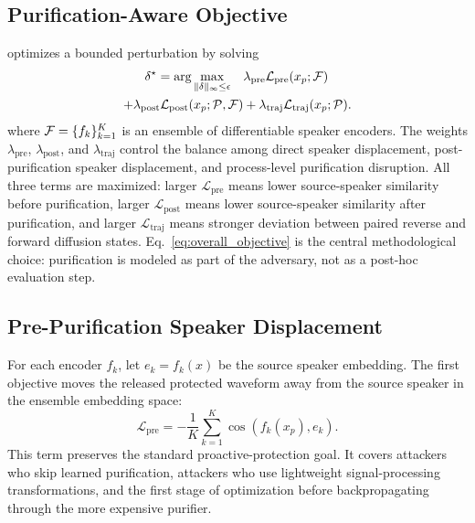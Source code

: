 \subsection{Purification-Aware Objective}

\method{} optimizes a bounded perturbation by solving
\begin{equation}
\begin{aligned}
    \delta^{\star}
    = \arg\max_{\|\delta\|_{\infty}\leq\epsilon}\quad
    &\lambda_{\text{pre}}\mathcal{L}_{\text{pre}}(x_p;\mathcal{F})\\
    + \lambda_{\text{post}}\mathcal{L}_{\text{post}}(x_p;\mathcal{P},\mathcal{F})
    &+ \lambda_{\text{traj}}\mathcal{L}_{\text{traj}}(x_p;\mathcal{P}).
\end{aligned}
\label{eq:overall_objective}
\end{equation}
where $\mathcal{F}=\{f_k\}_{k=1}^{K}$ is an ensemble of differentiable speaker encoders. 
The weights $\lambda_{\text{pre}}$, $\lambda_{\text{post}}$, and $\lambda_{\text{traj}}$ control the balance among direct speaker displacement, post-purification speaker displacement, and process-level purification disruption. 
All three terms are maximized: larger $\mathcal{L}_{\text{pre}}$ means lower source-speaker similarity before purification, larger $\mathcal{L}_{\text{post}}$ means lower source-speaker similarity after purification, and larger $\mathcal{L}_{\text{traj}}$ means stronger deviation between paired reverse and forward diffusion states.
Eq.~\eqref{eq:overall_objective} is the central methodological choice: purification is modeled as part of the adversary, not as a post-hoc evaluation step.

\subsection{Pre-Purification Speaker Displacement}

For each encoder $f_k$, let $e_k=f_k(x)$ be the source speaker embedding. 
The first objective moves the released protected waveform away from the source speaker in the ensemble embedding space:
\begin{equation}
    \mathcal{L}_{\text{pre}}
    =
    -\frac{1}{K}\sum_{k=1}^{K}
    \cos\!\left(f_k(x_p), e_k\right).
    \label{eq:pre_identity_loss}
\end{equation}
This term preserves the standard proactive-protection goal. 
It covers attackers who skip learned purification, attackers who use lightweight signal-processing transformations, and the first stage of optimization before backpropagating through the more expensive purifier.

